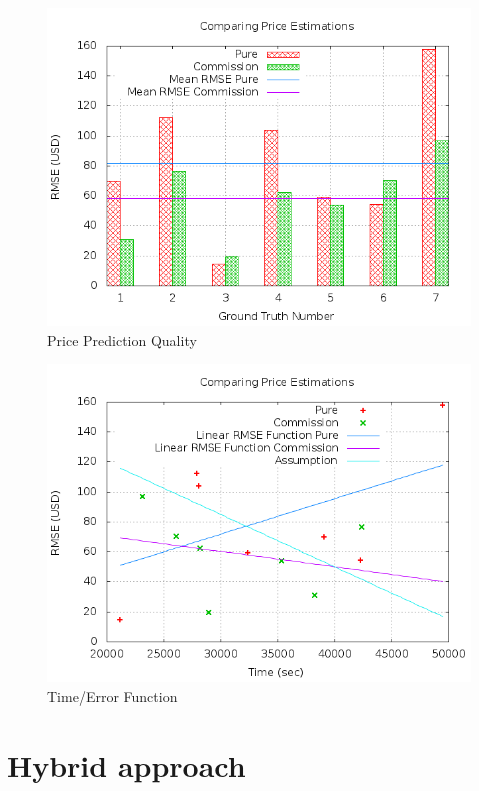 \begin{figure}
\centering
\includegraphics[scale=0.55]{images/plots/crowdsourcing/plot_price_rmse.png}
\caption{Price Prediction Quality}
\label{crowdsourcing_desc_length}
\end{figure}
\begin{figure}
\centering
\includegraphics[scale=0.55]{images/plots/crowdsourcing/plot_time_rmse.png}
\caption{Time/Error Function}
\label{crowdsourcing_desc_length}
\end{figure}
\section{Hybrid approach}
